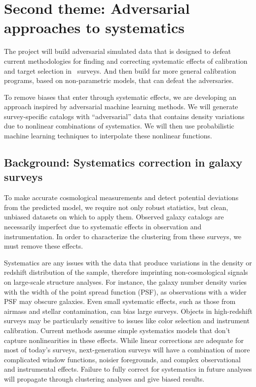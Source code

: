 \documentclass[12pt, fullpage, letterpaper]{article}
\begin{document}
\section{Second theme: Adversarial approaches to systematics}

The project will build adversarial simulated data that is
designed to defeat current methodologies for finding and correcting
systematic effects of calibration and target selection in \LSS\ 
surveys. And then build far more general calibration
programs, based on non-parametric models, that can defeat the
adversaries.

To remove biases that enter through systematic effects, we are developing an approach inspired by adversarial machine learning methods. 
We will generate survey-specific catalogs with ``adversarial'' data that contains density variations due to nonlinear combinations of systematics.
We will then use probabilistic machine learning techniques to interpolate these nonlinear functions.

\subsection{Background: Systematics correction in galaxy surveys}

To make accurate cosmological measurements and detect potential deviations from the predicted model, we require not only robust statistics, but clean, unbiased datasets on which to apply them.
Observed galaxy catalogs are necessarily imperfect due to systematic effects in observation and instrumentation. 
In order to characterize the clustering from these surveys, we must remove these effects.

Systematics are any issues with the data that produce variations in the density or redshift distribution of the sample, therefore imprinting non-cosmological signals on large-scale structure analyses.
For instance, the galaxy number density varies with the width of the point spread function (PSF), as observations with a wider PSF may obscure galaxies.
Even small systematic effects, such as those from airmass and stellar contamination, can bias large surveys. 
Objects in high-redshift surveys may be particularly sensitive to issues like color selection and instrument calibration.
Current methods assume simple systematics models that don't capture nonlinearities in these effects.
While linear corrections are adequate for most of today's surveys, next-generation surveys will have a combination of more complicated window functions, noisier foregrounds, and complex observational and instrumental effects.
Failure to fully correct for systematics in future analyses will propagate through clustering analyses and give biased results.
\end{document}
